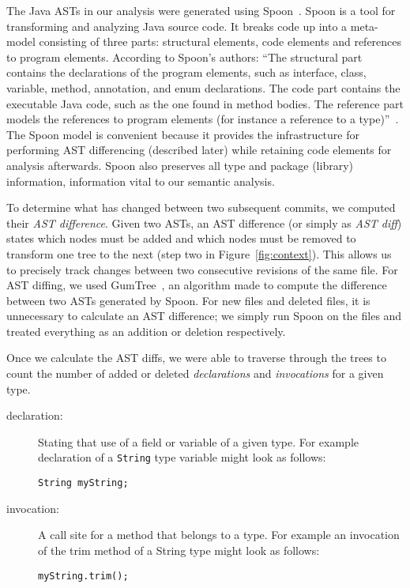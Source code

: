 The Java ASTs in our analysis were generated using Spoon~\cite{pawlak:hal-01169705}. Spoon is a tool for transforming and analyzing Java source code. It breaks code up into a meta-model consisting of three parts: structural elements, code elements and references to program elements. According to Spoon's authors: ``The structural part contains the declarations of the program elements, such as interface, class, variable, method, annotation, and enum declarations.  The code part contains the executable Java code, such as the one found in method bodies. The reference part models the references to program elements (for instance a reference to a type)''~\cite{pawlak:hal-01169705}. The Spoon model is convenient because it provides the infrastructure for performing AST differencing (described later) while retaining code elements for analysis afterwards. Spoon also preserves all type and package (library) information, information vital to our semantic analysis.

To determine what has changed between two subsequent commits, we computed their \emph{AST difference}. Given two ASTs, an AST difference (or simply as \emph{AST diff}) states which nodes must be added and which nodes must be removed to transform one tree to the next (step two in Figure~\ref{fig:context}). This allows us to precisely track changes between two consecutive revisions of the same file. For AST diffing, we used GumTree~\cite{falleri:hal-01054552}, an algorithm made to compute the difference between two ASTs generated by Spoon. For new files and deleted files, it is unnecessary to calculate an AST difference; we simply run Spoon on the files and treated everything as an addition or deletion respectively.

Once we calculate the AST diffs, we were able to traverse through the trees to count the number of added or deleted \emph{declarations} and \emph{invocations} for a given type.

\begin{description}
\item [declaration:]
  Stating that use of a field or variable of a given type. For example declaration of a \texttt{String} type variable might look as follows:
  \\
  \begin{adjustwidth}{2.5em}{0pt}
  \texttt{String myString;} \\
  \end{adjustwidth}
\item [invocation:]
  A call site for a method that belongs to a type. For example an invocation of the trim method of a String type might look as follows:
  \\
  \begin{adjustwidth}{2.5em}{0pt}
  \texttt{myString.trim();} \\
  \end{adjustwidth}
\end{description}

